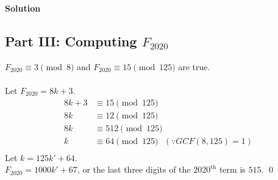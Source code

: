 \documentclass{article}
\newenvironment{solution}{\begin{trivlist}\item[]
{\bf Solution}}{\qed \end{trivlist}}
\begin{document}
\begin{solution}
\subsection*{Part III: Computing $F_{2020}$}
$F_{2020} \equiv 3 \pmod{8}$ and $F_{2020} \equiv 15 \pmod{125}$ are true.
\\\\
Let $F_{2020}=8k+3$.
\begin{align*}
    8k+3&\equiv15\pmod{125} \\
    8k&\equiv12\pmod{125} \\
    8k&\equiv512\pmod{125} \\
    k&\equiv64\pmod{125} \text{ }(\because GCF(8,125)=1)\\
\end{align*}
Let $k=125k'+64$. \\
$F_{2020}=1000k'+67$, or the last three digits of the $2020^{\text{th}}$ term is $\boxed{515}$.
\end{solution}
\end{document}
